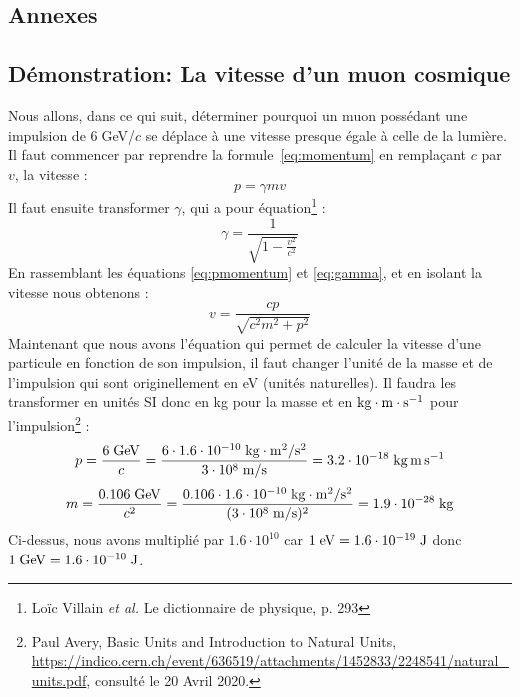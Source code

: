 \documentclass[a4paper, 12pt]{article}
\begin{document}
\begin{spacing}{1.5}
\pagebreak
\appendix
\section{Annexes}

\subsection{Démonstration: La vitesse d'un muon cosmique}
\label{annexe 1}

Nous allons, dans ce qui suit, déterminer pourquoi un muon possédant une impulsion de $6\;$GeV/$c$ se déplace à une vitesse presque égale à celle de la lumière. Il faut commencer par reprendre la formule~\ref{eq:momentum} en remplaçant $c$ par $v$, la vitesse :
\begin{equation}
p = \gamma mv \label{eq:pmomentum}
\end{equation}
Il faut ensuite transformer $\gamma$, qui a pour équation\footnote{Loïc Villain \emph{et al.} Le dictionnaire de physique, p. 293} :
\begin{equation}
\gamma = \frac{1}{\sqrt{1 - \frac{v^2}{c^2}}} \label{eq:gamma}
\end{equation}
En rassemblant les équations \ref{eq:pmomentum} et \ref{eq:gamma}, et en isolant la vitesse nous obtenons :
\begin{equation}
v = \frac{cp}{\sqrt{c^2m^2+p^2}} \label{eq:vannexe1}
\end{equation}
Maintenant que nous avons l'équation qui permet de calculer la vitesse d'une particule en fonction de son impulsion, il faut changer l'unité de la masse et de l'impulsion qui sont originellement en eV (unités naturelles). Il faudra les transformer en unités SI donc en kg pour la masse et en ${\rm kg\cdot m\cdot s^{-1}}$ pour l'impulsion\footnote{Paul Avery, Basic Units and Introduction to Natural Units, \url{https://indico.cern.ch/event/636519/attachments/1452833/2248541/natural_units.pdf}, consulté le 20 Avril 2020.} :
\begin{equation}
p = \frac{6 \;{\rm GeV}}{c} = \frac{6\cdot 1.6\cdot 10^{-10}\;{\rm kg\cdot m^2 / s^2}}{3\cdot 10^8\;{\rm m/s}} = 3.2\cdot 10^{-18}\; {\rm kg\,m\,s^{-1}} \label{eq:change1}
\end{equation}
\begin{equation}
m = \frac{0.106 \;{\rm GeV}}{c^2} = \frac{0.106\cdot 1.6\cdot 10^{-10}\;{\rm kg\cdot m^2 / s^2}}{(3\cdot 10^8\;{\rm m/s})^2} = 1.9\cdot 10^{-28}\; {\rm kg} \label{eq:change2}
\end{equation}
Ci-dessus, nous avons multiplié par $1.6\cdot10^{10}$ car $1\;{\rm eV} = 1.6\cdot10^{-19}\;{\rm J}$ donc $1\;{\rm GeV} = 1.6\cdot10^{-10}\;{\rm J}$.


\end{spacing}
\end{document}
